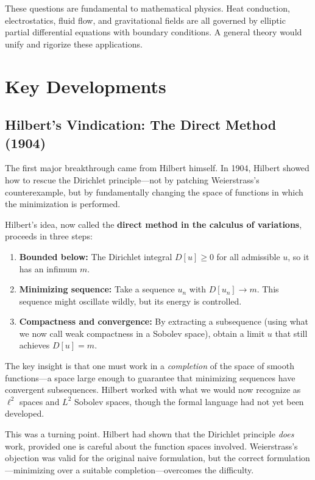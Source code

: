 These questions are fundamental to mathematical physics. Heat conduction, electrostatics, fluid flow, and gravitational fields are all governed by elliptic partial differential equations with boundary conditions. A general theory would unify and rigorize these applications.

\section{Key Developments}

\subsection{Hilbert's Vindication: The Direct Method (1904)}

The first major breakthrough came from Hilbert himself. In 1904, Hilbert showed how to rescue the Dirichlet principle---not by patching Weierstrass's counterexample, but by fundamentally changing the space of functions in which the minimization is performed.

Hilbert's idea, now called the \textbf{direct method in the calculus of variations}, proceeds in three steps:

\begin{enumerate}
    \item \textbf{Bounded below:} The Dirichlet integral $D[u] \geq 0$ for all admissible $u$, so it has an infimum $m$.
    \item \textbf{Minimizing sequence:} Take a sequence $u_n$ with $D[u_n] \to m$. This sequence might oscillate wildly, but its energy is controlled.
    \item \textbf{Compactness and convergence:} By extracting a subsequence (using what we now call weak compactness in a Sobolev space), obtain a limit $u$ that still achieves $D[u] = m$.
\end{enumerate}

The key insight is that one must work in a \emph{completion} of the space of smooth functions---a space large enough to guarantee that minimizing sequences have convergent subsequences. Hilbert worked with what we would now recognize as $\ell^2$ spaces and $L^2$ Sobolev spaces, though the formal language had not yet been developed.

This was a turning point. Hilbert had shown that the Dirichlet principle \emph{does} work, provided one is careful about the function spaces involved. Weierstrass's objection was valid for the original naive formulation, but the correct formulation---minimizing over a suitable completion---overcomes the difficulty.

